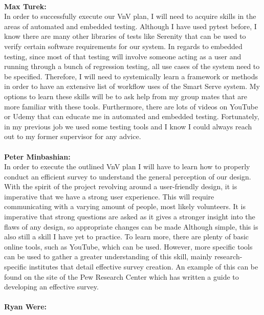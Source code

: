 \documentclass[12pt, titlepage]{article}
\begin{document}
 \\
\noindent\textbf{Max Turek:} \\
\indent In order to successfully execute our VnV plan, I will need to acquire skills in the areas of automated and embedded testing. Although I have used pytest before, I know there are many other libraries of tests like Serenity that can be used to verify certain software requirements for our system. In regards to embedded testing, since most of that testing will involve someone acting as a user and running through a bunch of regression testing, all use cases of the system need to be specified. Therefore, I will need to systemically learn a framework or methods in order to have an extensive list of workflow uses of the Smart Serve system. My options to learn these skills will be to ask help from my group mates that are more familiar with these tools. Furthermore, there are lots of videos on YouTube or Udemy that can educate me in automated and embedded testing. Fortunately, in my previous job we used some testing tools and I know I could always reach out to my former supervisor for any advice. 
\\\\
\noindent\textbf{Peter Minbashian:} \\
\indent
In order to execute the outlined VnV plan I will have to learn how to properly conduct an efficient survey to understand the general perception of our design. With the spirit of the project revolving around a user-friendly design, it is imperative that we have a strong user experience. This will require communicating with a varying amount of people, most likely volunteers. It is imperative that strong questions are asked as it gives a stronger insight into the flaws of any design, so appropriate changes can be made Although simple, this is also still a skill I have yet to practice. To learn more, there are plenty of basic online tools, such as YouTube, which can be used. However, more specific tools can be used to gather a greater understanding of this skill, mainly research-specific institutes that detail effective survey creation. An example of this can be found on the site of the Pew Research Center which has written a guide to developing an effective survey.
\\\\
\noindent\textbf{Ryan Were:} \\
\end{document}
